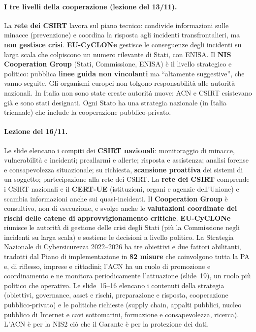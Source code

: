 \paragraph{I tre livelli della cooperazione (lezione del 13/11).} La \textbf{rete dei CSIRT} lavora sul
piano tecnico: condivide informazioni sulle minacce (prevenzione) e coordina la risposta agli incidenti
transfrontalieri, ma \textbf{non gestisce crisi}. \textbf{EU-CyCLONe} gestisce le conseguenze degli
incidenti su larga scala che colpiscono un numero rilevante di Stati, con ENISA. Il \textbf{NIS
Cooperation Group} (Stati, Commissione, ENISA) è il livello strategico e politico: pubblica
\textbf{linee guida non vincolanti} ma ``altamente suggestive'', che vanno seguite. Gli organismi europei
non tolgono responsabilità alle autorità nazionali. In Italia non sono state create autorità nuove: ACN
e CSIRT esistevano già e sono stati designati. Ogni Stato ha una strategia nazionale (in Italia
triennale) che include la cooperazione pubblico-privato.

\paragraph{Lezione del 16/11.} Le slide elencano i compiti dei \textbf{CSIRT nazionali}: monitoraggio
di minacce, vulnerabilità e incidenti; preallarmi e allerte; risposta e assistenza; analisi forense e
consapevolezza situazionale; su richiesta, \textbf{scansione proattiva} dei sistemi di un soggetto;
partecipazione alla rete dei CSIRT. La \textbf{rete dei CSIRT} comprende i CSIRT nazionali e il
\textbf{CERT-UE} (istituzioni, organi e agenzie dell'Unione) e scambia informazioni anche sui
quasi-incidenti. Il \textbf{Cooperation Group} è consultivo, non di esecuzione, e
svolge anche le \textbf{valutazioni coordinate dei rischi delle catene di approvvigionamento critiche}.
\textbf{EU-CyCLONe} riunisce le autorità di gestione delle crisi degli Stati (più la Commissione negli
incidenti su larga scala) e sostiene le decisioni a livello politico. La Strategia Nazionale di
Cybersicurezza 2022--2026 ha tre obiettivi e due fattori abilitanti, tradotti dal Piano di implementazione
in \textbf{82 misure} che coinvolgono tutta la PA e, di riflesso, imprese e cittadini; l'ACN ha un ruolo di
promozione e coordinamento e ne monitora periodicamente l'attuazione (slide~19), un ruolo più politico
che operativo. Le slide~15--16 elencano i contenuti della strategia (obiettivi, governance, asset e
rischi, preparazione e risposta, cooperazione pubblico-privato) e le politiche richieste (supply chain,
appalti pubblici, nucleo pubblico di Internet e cavi sottomarini, formazione e consapevolezza,
ricerca). L'ACN è per la NIS2 ciò che il Garante è per la protezione dei dati.

